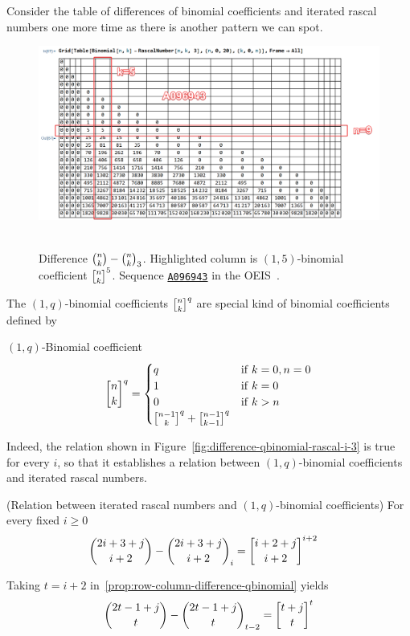 ﻿Consider the table of differences of binomial coefficients and iterated rascal numbers one more time
as there is another pattern we can spot.
\begin{figure}[H]
    \centering
    \includegraphics[width=1\textwidth]{../img/03_Difference_Binomial_Rascal_i_3_OneQBinomialCoefficients}
    ~\caption{Difference $\binom{n}{k}-\binom{n}{k}_{3}$.
    Highlighted column is $(1,5)$-binomial coefficient $\oneQBinomial{n}{k}{5}$.
    Sequence \href{https://oeis.org/A096943}{\texttt{A096943}} in the OEIS~\cite{sloane2004sixth}.}
    \label{fig:difference-qbinomial-rascal-i-3}
\end{figure}
The $(1,q)$-binomial coefficients $\oneQBinomial{n}{k}{q}$ are special kind of binomial coefficients defined by
\begin{definition}
    $(1,q)$-Binomial coefficient~\cite{sloane2004pascal}
    \begin{equation}
        \oneQBinomial{n}{k}{q} =
        \begin{cases}
            q & \mathrm{if} \; k=0, n=0 \\
            1 & \mathrm{if} \; k=0 \\
            0 & \mathrm{if} \; k > n \\
            \oneQBinomial{n-1}{k}{q} + \oneQBinomial{n-1}{k-1}{q}
        \end{cases}\label{eq:qbinomial-definition}
    \end{equation}
\end{definition}
Indeed, the relation shown in Figure~\eqref{fig:difference-qbinomial-rascal-i-3} is true for every $i$,
so that it establishes a relation between $(1,q)$-binomial coefficients and iterated rascal numbers.
\begin{proposition} (Relation between iterated rascal numbers and $(1,q)$-binomial coefficients)
    For every fixed $i\geq0$
    \label{prop:row-column-difference-qbinomial}
    \begin{align*}
        \binom{2i+3+j}{i+2} - \rascalNumber{2i+3+j}{i+2}{i} &= \oneQBinomial{i+2+j}{i+2}{i+2}
    \end{align*}
\end{proposition}
Taking $t=i+2$ in~\eqref{prop:row-column-difference-qbinomial} yields
\begin{align*}
    \binom{2t-1+j}{t} - \rascalNumber{2t-1+j}{t}{t-2} = \oneQBinomial{t+j}{t}{t}
\end{align*}
